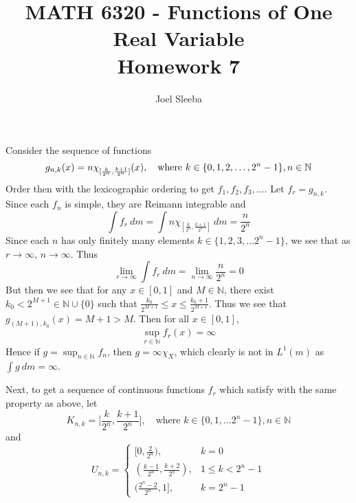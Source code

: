 \documentclass[12pt]{exam}
\theoremstyle{plain} %
\theoremstyle{definition} %
\theoremstyle{remark} %
\begin{document}
\title{MATH 6320 - Functions of One Real Variable\\ Homework  7}

\author{
  Joel Sleeba \\
}

\maketitle
\printanswers
\unframedsolutions

\begin{questions}

  \question
  \begin{solution}
    Consider the sequence of functions \[
      g_{n, k}(x) =
      n \chi_{[ \frac{k}{2^{n}}, \frac{k+1}{2^{n}}]}(x), \quad
      \textrm{where } k \in \{0, 1, 2, \ldots, 2^n-1  \}, n \in \mathbb{N} \\
    \]
    Order then with the lexicographic ordering to get $f_{1}, f_{2},
    f_{3}, \ldots$. Let $f_r = g_{n, k}$. Since each $f_n$ is simple,
    they are Reimann integrable and \[
      \int  f_r \ d m = \int  n \chi_{[ \frac{k}{2^n},
      \frac{k+1}{2^n}]}\ d m = \frac{n}{2^n}
    \]
    Since each $n$ has only finitely many elements $ k \in \{ 1, 2,
    3, \ldots 2^n-1 \}$, we see that as $r \to \infty$, $n \to \infty$. Thus \[
      \lim_{r \to \infty} \int f_r\ dm = \lim_{n \to \infty}
      \frac{n}{2^n} = 0
    \]
    But then we see that for any $x \in [0, 1]$ and $M \in
    \mathbb{N}$, there exist $k_0 <  2^{M+1} \in \mathbb{N} \cup \{0
    \}$ such that $\frac{k_0}{2^{M+1}}
    \le x \le \frac{k_0+1}{2^{M+1}}$. Thus we see that $g_{(M+1), k_0}(x) =
    M+1 >M$. Then for all $x \in [0, 1]$, \[
      \sup_{r \in \mathbb{N}} f_r(x) = \infty
    \]
    Hence if $g = \sup_{n \in \mathbb{N}}f_n$, then $g  = \infty
    \chi_X$, which clearly is not in $L^1(m)$ as $\int  g \ d m = \infty$.

    Next, to get a sequence of continuous functions $f_r$ which
    satisfy with the same property as above, let $$K_{n, k} =
    \Bigg[\frac{k}{2^n}, \frac{k+1}{2^n} \Bigg], \quad \textrm{where } k \in \{
    0, 1, \ldots 2^{n}-1 \}, n \in \mathbb{N}$$
    and \[
      U_{n, k} =
      \begin{cases}
        [0, \frac{2}{2^{n}}), & k = 0 \\
        (\frac{k-1}{2^n}, \frac{k+2}{2^n}), & 1 \le k < 2^{n} - 1 \\
        ( \frac{2^{n}-2}{2^n}, 1], & k = 2^n-1
      \end{cases}
    \]


\end{solution}
\end{questions}
\end{document}
